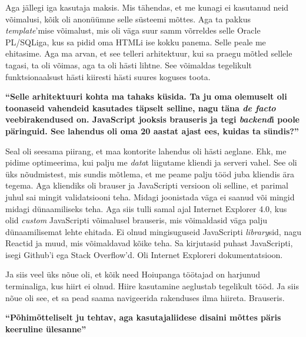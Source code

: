 Aga jällegi iga kasutaja maksis. Mis tähendas, et me kunagi ei kasutanud neid võimalusi, kõik oli anonüümne selle süsteemi mõttes. Aga ta pakkus \emph{template}'mise võimalust, mis oli väga suur samm võrreldes selle Oracle PL/SQLiga, kus sa pidid oma HTMLi ise kokku panema. Selle peale me ehitasime. Aga ma arvan, et see telleri arhitektuur, kui sa praegu mõtled sellele tagasi, ta oli võimas, aga ta oli hästi lihtne. See võimaldas tegelikult funktsionaalsust hästi kiiresti hästi suures koguses toota.

\textbf{\enquote{Selle arhitektuuri kohta ma tahaks küsida. Ta ju oma olemuselt oli toonaseid vahendeid kasutades täpselt selline, nagu täna \emph{de facto} veebirakendused on. JavaScript jooksis brauseris ja tegi \emph{backend}i poole päringuid. See lahendus oli oma 20 aastat ajast ees, kuidas ta sündis?}}

Seal oli seesama piirang, et maa kontorite lahendus oli hästi aeglane. Ehk, me pidime optimeerima, kui palju me \emph{data}t liigutame kliendi ja serveri vahel. See oli üks nõudmistest, mis sundis mõtlema, et me peame palju tööd juba kliendis ära tegema. Aga kliendiks oli brauser ja JavaScripti versioon oli selline, et parimal juhul sai mingit validatsiooni teha. Midagi joonistada väga ei saanud või mingid midagi dünaamiliseks teha. Aga siis tulli samal ajal Internet Explorer 4.0, kus olid \emph{custom} JavaScripti võimalusel brauseris, mis võimaldasid väga palju dünaamilisemat lehte ehitada. Ei olnud mingisuguseid JavaScripti \emph{library}sid, nagu Reactid ja muud, mis võimaldavad kõike teha. Sa kirjutasid puhast JavaScripti, isegi Github'i ega Stack Overflow'd. Oli Internet Exploreri dokumentatsioon.

Ja siis veel üks nõue oli, et kõik need Hoiupanga töötajad on harjunud terminaliga, kus  hiirt ei olnud. Hiire kasutamine aeglustab tegelikult tööd. Ja siis nõue oli see, et sa pead saama navigeerida rakenduses ilma hiireta. Brauseris. 

\textbf{\enquote{Põhimõtteliselt ju tehtav, aga kasutajaliidese disaini mõttes päris keeruline ülesanne}}

